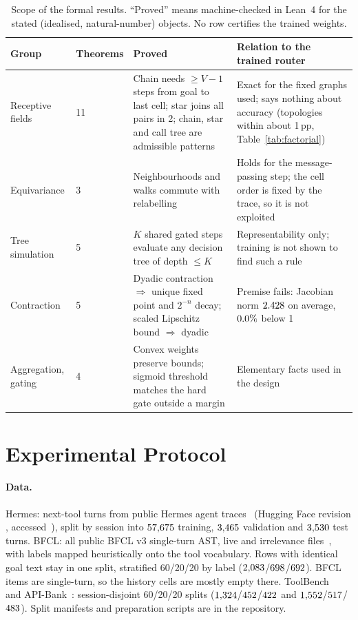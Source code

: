 \documentclass[10pt]{article}
\begin{document}
\begin{table}[t]
\centering
\footnotesize
\setlength{\tabcolsep}{3pt}
\caption{Scope of the formal results. ``Proved'' means machine-checked in Lean~4 for the stated (idealised, natural-number) objects. No row certifies the trained weights.}
\label{tab:theorem-scope}
\begin{tabularx}{\textwidth}{@{}p{2.4cm}p{1.3cm}XX@{}}
\toprule
Group & Theorems & Proved & Relation to the trained router \\
\midrule
Receptive fields & 11 & Chain needs $\ge V{-}1$ steps from goal to last cell; star joins all pairs in 2; chain, star and call tree are admissible patterns & Exact for the fixed graphs used; says nothing about accuracy (topologies within about 1\,pp, Table~\ref{tab:factorial}) \\
Equivariance & 3 & Neighbourhoods and walks commute with relabelling & Holds for the message-passing step; the cell order is fixed by the trace, so it is not exploited \\
Tree simulation & 5 & $K$ shared gated steps evaluate any decision tree of depth $\le K$ & Representability only; training is not shown to find such a rule \\
Contraction & 5 & Dyadic contraction $\Rightarrow$ unique fixed point and $2^{-n}$ decay; scaled Lipschitz bound $\Rightarrow$ dyadic & Premise fails: Jacobian norm $2.428$ on average, $0.0\%$ below 1 \\
Aggregation, gating & 4 & Convex weights preserve bounds; sigmoid threshold matches the hard gate outside a margin & Elementary facts used in the design \\
\bottomrule
\end{tabularx}
\end{table}

\section{Experimental Protocol}\label{sec:protocol}
\paragraph{Data.} Hermes: next-tool turns from public Hermes agent traces~\citep{hermestraces} (Hugging Face revision \texttt{\numHermesDatasetRevFull{}}, accessed~\numHermesDatasetAccess{}), split by session into $57{,}675$ training, $3{,}465$ validation and $3{,}530$ test turns. BFCL: all public BFCL v3 single-turn AST, live and irrelevance files~\citep{gorilla-bfcl}, with labels mapped heuristically onto the tool vocabulary. Rows with identical goal text stay in one split, stratified 60/20/20 by label ($2{,}083$/$698$/$692$). BFCL items are single-turn, so the history cells are mostly empty there. ToolBench~\citep{qin2023toolllm} and API-Bank~\citep{li2023apibank}: session-disjoint 60/20/20 splits ($1{,}324$/$452$/$422$ and $1{,}552$/$517$/$483$). Split manifests and preparation scripts are in the repository.
\end{document}
